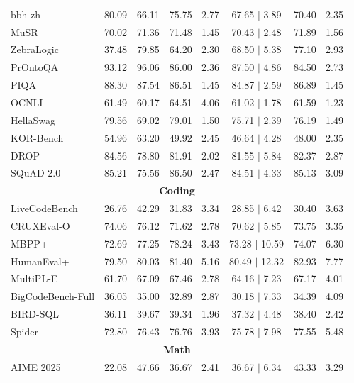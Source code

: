 \begin{table}[htbp]
{\begin{tabular}{lcc|ccc}
bbh-zh & 80.09 & 66.11 & 75.75 $\mid$ 2.77 & 67.65 $\mid$ 3.89 &  70.40 $\mid$ 2.35 \\
MuSR & 70.02 & 71.36 & 71.48 $\mid$ 1.45 & 70.43 $\mid$ 2.48 &  71.89 $\mid$ 1.56 \\
ZebraLogic & 37.48 & 79.85 & 64.20 $\mid$ 2.30 & 68.50 $\mid$ 5.38 &  77.10 $\mid$ 2.93 \\
PrOntoQA & 93.12 & 96.06 & 86.00 $\mid$ 2.36 & 87.50 $\mid$ 4.86 &  84.50 $\mid$ 2.73 \\
PIQA & 88.30 & 87.54 & 86.51 $\mid$ 1.45 & 84.87 $\mid$ 2.59 &  86.89 $\mid$ 1.45 \\
OCNLI & 61.49 & 60.17 & 64.51 $\mid$ 4.06 & 61.02 $\mid$ 1.78 &  61.59 $\mid$ 1.23 \\
HellaSwag & 79.56 & 69.02 & 79.01 $\mid$ 1.50 & 75.71 $\mid$ 2.39 &  76.19 $\mid$ 1.49 \\
KOR-Bench & 54.96 & 63.20 & 49.92 $\mid$ 2.45 & 46.64 $\mid$ 4.28 &  48.00 $\mid$ 2.35 \\
DROP & 84.56 & 78.80 & 81.91 $\mid$ 2.02 & 81.55 $\mid$ 5.84 &  82.37 $\mid$ 2.87 \\
SQuAD 2.0 & 85.21 & 75.56 & 86.50 $\mid$ 2.47 & 84.51 $\mid$ 4.33 &  85.13 $\mid$ 3.09 \\
\midrule
\multicolumn{6}{c}{\textbf{Coding}} \\
\midrule
LiveCodeBench & 26.76 & 42.29 & 31.83 $\mid$ 3.34 & 28.85 $\mid$ 6.42 &  30.40 $\mid$ 3.63 \\
CRUXEval-O & 74.06 & 76.12 & 71.62 $\mid$ 2.78 & 70.62 $\mid$ 5.85 &  73.75 $\mid$ 3.35 \\
MBPP+ & 72.69 & 77.25 & 78.24 $\mid$ 3.43 & 73.28 $\mid$ 10.59 &  74.07 $\mid$ 6.30 \\
HumanEval+ & 79.50 & 80.03 & 81.40 $\mid$ 5.16 & 80.49 $\mid$ 12.32 &  82.93 $\mid$ 7.77 \\
MultiPL-E & 61.70 & 67.09 & 67.46 $\mid$ 2.78 & 64.16 $\mid$ 7.23 &  67.17 $\mid$ 4.01 \\
BigCodeBench-Full & 36.05 & 35.00 & 32.89 $\mid$ 2.87 & 30.18 $\mid$ 7.33 &  34.39 $\mid$ 4.09 \\
BIRD-SQL & 36.11 & 39.67 & 39.34 $\mid$ 1.96 & 37.32 $\mid$ 4.48 &  38.40 $\mid$ 2.42 \\
Spider & 72.80 & 76.43 & 76.76 $\mid$ 3.93 & 75.78 $\mid$ 7.98 &  77.55 $\mid$ 5.48 \\
\midrule
\multicolumn{6}{c}{\textbf{Math}} \\
\midrule
AIME 2025 & 22.08 & 47.66 & 36.67 $\mid$ 2.41 & 36.67 $\mid$ 6.34 &  43.33 $\mid$ 3.29 \\

\end{tabular}}
\end{table}
